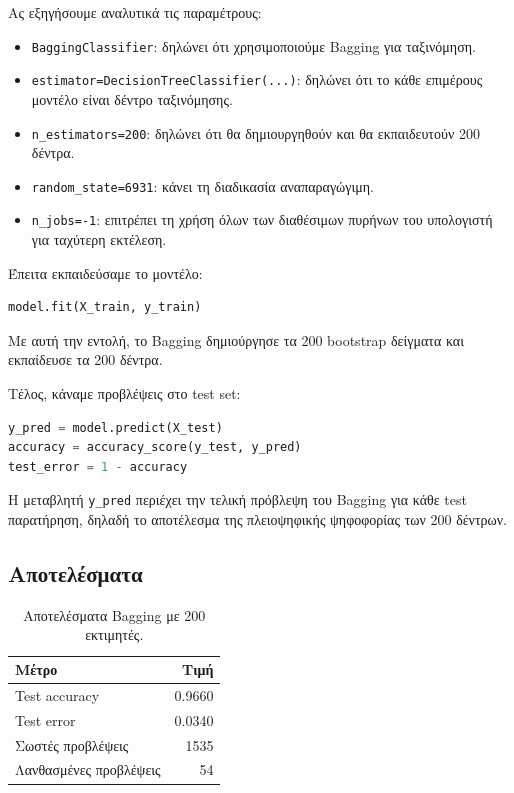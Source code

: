 \documentclass[12pt,a4paper]{article}
\newcommand{\code}[1]{\texttt{\textenglish{#1}}}
\begin{document}
Ας εξηγήσουμε αναλυτικά τις παραμέτρους:

\begin{itemize}
    \item \code{BaggingClassifier}: δηλώνει ότι χρησιμοποιούμε Bagging για
    ταξινόμηση.
    \item \code{estimator=DecisionTreeClassifier(...)}: δηλώνει ότι το κάθε
    επιμέρους μοντέλο είναι δέντρο ταξινόμησης.
    \item \code{n\_estimators=200}: δηλώνει ότι θα δημιουργηθούν και θα
    εκπαιδευτούν 200 δέντρα.
    \item \code{random\_state=6931}: κάνει τη διαδικασία αναπαραγώγιμη.
    \item \code{n\_jobs=-1}: επιτρέπει τη χρήση όλων των διαθέσιμων πυρήνων
    του υπολογιστή για ταχύτερη εκτέλεση.
\end{itemize}

Έπειτα εκπαιδεύσαμε το μοντέλο:

\begin{lstlisting}[language=Python]
model.fit(X_train, y_train)
\end{lstlisting}

Με αυτή την εντολή, το Bagging δημιούργησε τα 200 bootstrap δείγματα και
εκπαίδευσε τα 200 δέντρα.

Τέλος, κάναμε προβλέψεις στο test set:

\begin{lstlisting}[language=Python]
y_pred = model.predict(X_test)
accuracy = accuracy_score(y_test, y_pred)
test_error = 1 - accuracy
\end{lstlisting}

Η μεταβλητή \code{y\_pred} περιέχει την τελική πρόβλεψη του Bagging για κάθε
test παρατήρηση, δηλαδή το αποτέλεσμα της πλειοψηφικής ψηφοφορίας των 200
δέντρων.

\subsection{Αποτελέσματα}

\begin{table}[H]
\centering
\caption{Αποτελέσματα Bagging με 200 εκτιμητές.}
\begin{tabular}{lr}
\toprule
\textbf{Μέτρο} & \textbf{Τιμή} \\
\midrule
Test accuracy & 0.9660 \\
Test error & 0.0340 \\
Σωστές προβλέψεις & 1535 \\
Λανθασμένες προβλέψεις & 54 \\
\bottomrule
\end{tabular}
\end{table}
\end{document}
